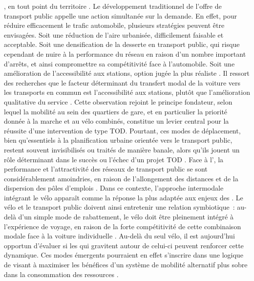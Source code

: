 \begin{refsegment}
{}, en tout point du territoire \textcolor{blue}{\autocite[8]{molino_pratiques_2015}}. Le développement traditionnel de l’offre de transport public appelle une action simultanée sur la demande. En effet, pour réduire efficacement le trafic automobile, plusieurs stratégies peuvent être envisagées. Soit une réduction de l'aire urbanisée, difficilement faisable et acceptable. Soit une densification de la desserte en transport public, qui risque cependant de nuire à la performance du réseau en raison d'un nombre important d'arrêts, et ainsi compromettre sa compétitivité face à l'automobile. Soit une amélioration de l’accessibilité aux stations, option jugée la plus réaliste \textcolor{blue}{\autocite[10]{verbavatz_critical_2019}}. Il ressort des recherches que le facteur déterminant du transfert modal de la voiture vers les transports en commun est l’accessibilité aux stations, plutôt que l’amélioration qualitative du service \textcolor{blue}{\autocite[146]{brons_access_2009}}. Cette observation rejoint le principe fondateur, selon lequel la mobilité au sein des quartiers de gare, et en particulier la priorité donnée à la marche et au vélo combinés, constitue un levier central pour la réussite d’une intervention de type \acrshort{TOD}. Pourtant, ces modes de déplacement, bien qu’essentiels à la planification urbaine orientée vers le transport public, restent souvent invisibilisés ou traités de manière banale, alors qu’ils jouent un rôle déterminant dans le succès ou l’échec d’un projet \acrshort{TOD} \textcolor{blue}{\autocite[34]{schlossberg_comparing_2004}}. Face à l’, la performance et l’attractivité des réseaux de transport public se sont considérablement amoindries, en raison de l’allongement des distances et de la dispersion des pôles d’emplois \textcolor{blue}{\autocite[13]{bentayou_transit-oriented_2015}}. Dans ce contexte, l’approche intermodale intégrant le vélo apparaît comme la réponse la plus adaptée aux enjeux des . Le vélo et le transport public doivent ainsi entretenir une relation symbiotique~: au-delà d’un simple mode de rabattement, le vélo doit être pleinement intégré à l’expérience de voyage, en raison de la forte compétitivité de cette combinaison modale face à la voiture individuelle \textcolor{blue}{\autocite[208]{kager_characterisation_2016}}. Au-delà du seul vélo, il est aujourd’hui opportun d’évaluer si les  qui gravitent autour de celui-ci peuvent renforcer cette dynamique. Ces modes émergents pourraient en effet s’inscrire dans une logique de  visant à maximiser les bénéfices d’un système de mobilité alternatif plus sobre dans la consommation des ressources \textcolor{blue}{\autocite[134]{litman_new_2021}}.%


\end{refsegment}
